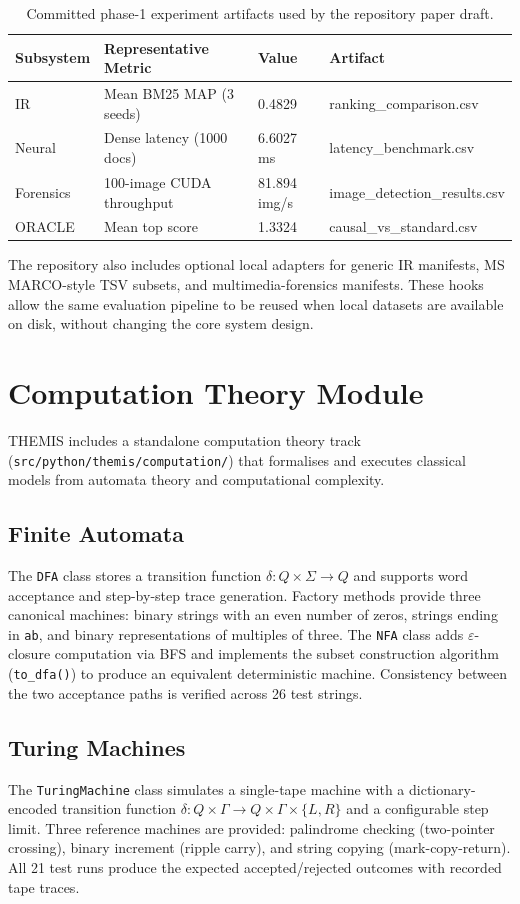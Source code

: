 \documentclass{article}
\begin{document}
\begin{table}[h]
\centering
\begin{tabular}{llll}
\toprule
Subsystem & Representative Metric & Value & Artifact \\
\midrule
IR & Mean BM25 MAP (3 seeds) & 0.4829 & ranking\_comparison.csv \\
Neural & Dense latency (1000 docs) & 6.6027 ms & latency\_benchmark.csv \\
Forensics & 100-image CUDA throughput & 81.894 img/s & image\_detection\_results.csv \\
ORACLE & Mean top score & 1.3324 & causal\_vs\_standard.csv \\
\bottomrule
\end{tabular}
\caption{Committed phase-1 experiment artifacts used by the repository paper draft.}
\end{table}

The repository also includes optional local adapters for generic IR manifests, MS MARCO-style TSV subsets, and multimedia-forensics manifests. These hooks allow the same evaluation pipeline to be reused when local datasets are available on disk, without changing the core system design.

\section{Computation Theory Module}
THEMIS includes a standalone computation theory track (\texttt{src/python/themis/computation/}) that formalises and executes classical models from automata theory and computational complexity.

\subsection{Finite Automata}
The \texttt{DFA} class stores a transition function $\delta: Q \times \Sigma \rightarrow Q$ and supports word acceptance and step-by-step trace generation. Factory methods provide three canonical machines: binary strings with an even number of zeros, strings ending in \texttt{ab}, and binary representations of multiples of three. The \texttt{NFA} class adds $\varepsilon$-closure computation via BFS and implements the subset construction algorithm (\texttt{to\_dfa()}) to produce an equivalent deterministic machine. Consistency between the two acceptance paths is verified across 26 test strings.

\subsection{Turing Machines}
The \texttt{TuringMachine} class simulates a single-tape machine with a dictionary-encoded transition function $\delta: Q \times \Gamma \rightarrow Q \times \Gamma \times \{L, R\}$ and a configurable step limit. Three reference machines are provided: palindrome checking (two-pointer crossing), binary increment (ripple carry), and string copying (mark-copy-return). All 21 test runs produce the expected accepted/rejected outcomes with recorded tape traces.
\end{document}
